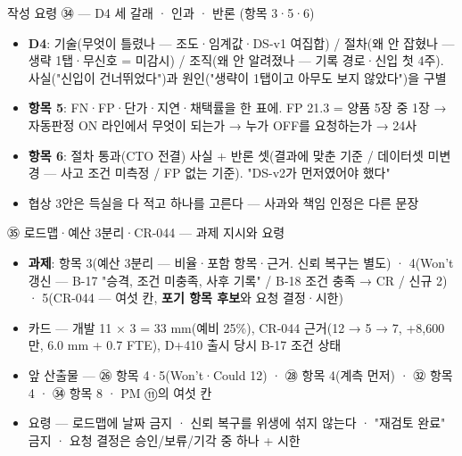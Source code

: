 \begin{frame}{작성 요령 ㉞ — D4 세 갈래 · 인과 · 반론 (항목 3·5·6)}
\begin{itemize}
\item \textbf{D4}: 기술(무엇이 틀렸나 — 조도·임계값·DS-v1 여집합) / 절차(왜 안 잡혔나 — 생략 1탭·무신호 = 미감시) / 조직(왜 안 알려졌나 — 기록 경로·신입 첫 4주). 사실("신입이 건너뛰었다")과 원인("생략이 1탭이고 아무도 보지 않았다")을 구별
\item \textbf{항목 5}: FN·FP·단가·지연·채택률을 한 표에. FP 21.3 = 양품 5장 중 1장 → 자동판정 ON 라인에서 무엇이 되는가 → 누가 OFF를 요청하는가 → 24사
\item \textbf{항목 6}: 절차 통과(CTO 전결) 사실 + 반론 셋(결과에 맞춘 기준 / 데이터셋 미변경 — 사고 조건 미측정 / FP 없는 기준). "DS-v2가 먼저였어야 했다"
\item 협상 3안은 득실을 다 적고 하나를 고른다 — 사과와 책임 인정은 다른 문장
\end{itemize}
\end{frame}

\begin{frame}{㉟ 로드맵·예산 3분리·CR-044 — 과제 지시와 요령}
\begin{itemize}
\item \textbf{과제}: 항목 3(예산 3분리 — 비율·포함 항목·근거. 신뢰 복구는 별도) · 4(Won't 갱신 — B-17 "승격, 조건 미충족, 사후 기록" / B-18 조건 충족 → CR / 신규 2) · 5(CR-044 — 여섯 칸, \textbf{포기 항목 후보}와 요청 결정·시한)
\item 카드 — 개발 11 × 3 = 33 mm(예비 25\%), CR-044 근거(12 → 5 → 7, +8,600만, 6.0 mm + 0.7 FTE), D+410 출시 당시 B-17 조건 상태
\item 앞 산출물 — ㉖ 항목 4·5(Won't·Could 12) · ㉘ 항목 4(계측 먼저) · ㉜ 항목 4 · ㉞ 항목 8 · PM ⑪의 여섯 칸
\item 요령 — 로드맵에 날짜 금지 · 신뢰 복구를 위생에 섞지 않는다 · "재검토 완료" 금지 · 요청 결정은 승인/보류/기각 중 하나 + 시한
\end{itemize}
\end{frame}

